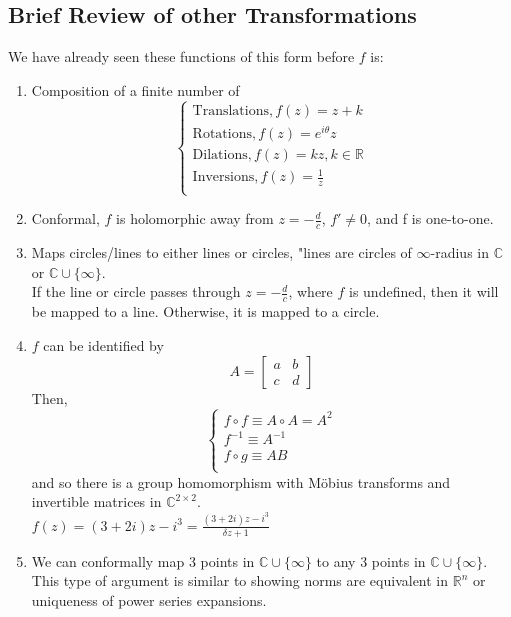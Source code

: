 \documentclass[11pt]{article}
\begin{document}
\subsection{Brief Review of other Transformations}
We have already seen these functions of this form before $f$ is: 
\begin{enumerate}[leftmargin = *, nolistsep]
\item Composition of a finite number of 
$$
\begin{cases} 
	\text{Translations}, f(z) = z + k \\
	\text{Rotations}, f(z) = e^{i\theta}z \\
	\text{Dilations}, f(z) = kz, k \in \mathbb{R} \\
	\text{Inversions}, f(z) = \frac{1}{z}\\
\end{cases}
$$
\item Conformal, $f$ is holomorphic away from $z = -\frac{d}{c}$, $f' \neq 0$, and f is one-to-one. 
\item Maps circles/lines to either lines or circles, "lines are circles of $\infty$-radius in $\mathbb{C}$ or $\mathbb{C} \cup \{\infty\}$. \\
If the line or circle passes through $z = -\frac{d}{c}$, where $f$ is undefined, then it will be mapped to a line. Otherwise, it is mapped to a circle. 
\item $f$ can be identified by 
\begin{equation*}
A = 
\begin{bmatrix}
 a & b \\
 c & d
\end{bmatrix}
\end{equation*}
Then,
\[ \begin{cases} 
	f \circ f \equiv A \circ A = A^2 \\
	f^{-1} \equiv A^{-1} \\
	f \circ g \equiv AB \\
   \end{cases}
\]
and so there is a group homomorphism with Möbius transforms and invertible matrices in $\mathbb{C}^{2 \times 2}$. \\
$f(z) = (3 + 2i)z - i^3 = \frac{(3 + 2i)z - i^3}{\delta z + 1}$ \\
\item We can conformally map 3 points in $\mathbb{C} \cup \{\infty\}$ to any 3 points in $\mathbb{C} \cup \{\infty\}$. \\
This type of argument is similar to showing norms are equivalent in $\mathbb{R}^n$ or uniqueness of power series expansions. 
\end{enumerate}
\end{document}
